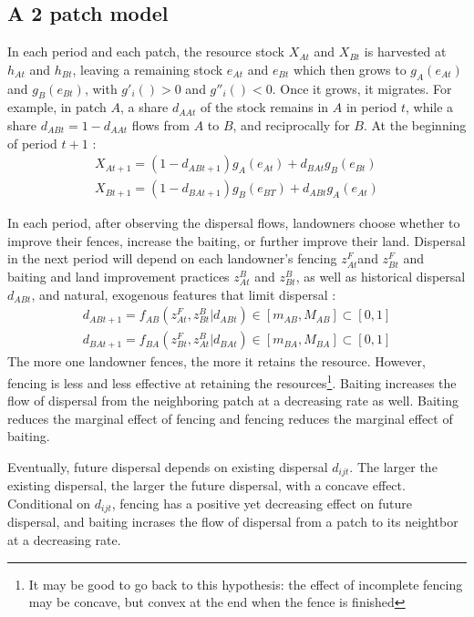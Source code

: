 \documentclass{article}
\begin{document}
\subsection{A 2 patch model}
In each period and each patch, the resource stock $X_{At}$ and $ X_{Bt}$ is harvested at $h_{At}$ and $h_{Bt}$, leaving a remaining stock $e_{At}$ and $ e_{Bt}$ which then grows to $g_A(e_{At})$ and $g_B(e_{Bt})$, with $g'_i()>0$ and $g''_i()<0$. Once it grows, it migrates. For example, in patch $A$, a share $d_{AAt}$ of the stock remains in $A$ in period $t$, while a share $d_{ABt} = 1-d_{AAt}$ flows from $A$ to $B$, and reciprocally for $B$. At the beginning of period $t+1$ : 
\begin{align}
    X_{At+1} = (1-d_{ABt+1})g_A(e_{At})+d_{BAt}g_B(e_{Bt})
    \\
    X_{Bt+1} = (1 - d_{BAt+1})g_B(e_{BT}) + d_{ABt}g_A(e_{At})
\end{align}

In each period, after observing the dispersal flows, landowners choose whether to improve their fences, increase the baiting, or further improve their land. 
Dispersal in the next period will depend on each landowner's fencing $z_{At}^F$and $z_{Bt}^F$ and baiting and land improvement practices $z_{At}^B$ and $z_{Bt}^B$, as well as historical dispersal $d_{ABt}$, and natural, exogenous features that limit dispersal : 
\begin{align}
    d_{ABt+1} = f_{AB}(z^F_{At}, z^B_{Bt}| d_{ABt}) \in [m_{AB},M_{AB}] \subset [0,1] \\
    d_{BAt+1} = f_{BA}(z^F_{Bt}, z^B_{At}| d_{BAt}) \in [m_{BA},M_{BA}] \subset [0,1]
\end{align}
The more one landowner fences, the more it retains the resource. However, fencing is less and less effective at retaining the resources\footnote{It may be good to go back to this hypothesis: the effect of incomplete fencing may be concave, but convex at the end when the fence is finished}. Baiting increases the flow of dispersal from the neighboring patch at a decreasing rate as well. Baiting reduces the marginal effect of fencing and fencing reduces the marginal effect of baiting.

Eventually, future dispersal depends on existing dispersal $d_{ijt}$. The larger the existing dispersal, the larger the future dispersal, with a concave effect. Conditional on $d_{ijt}$, fencing has a positive yet decreasing effect on future dispersal, and baiting incrases the flow of dispersal from a patch to its neightbor at a decreasing rate. 
\end{document}
